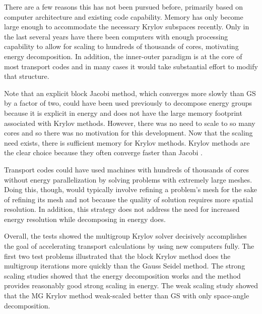 There are a few reasons this has not been pursued before, primarily based on computer architecture and existing code capability. Memory has only become large enough to accommodate the necessary Krylov subspaces recently. Only in the last several years have there been computers with enough processing capability to allow for scaling to hundreds of thousands of cores, motivating energy decomposition. In addition, the inner-outer paradigm is at the core of most transport codes and in many cases it would take substantial effort to modify that structure. 

Note that an explicit block Jacobi method, which converges more slowly than GS by a factor of two, could have been used previously to decompose energy groups because it is explicit in energy and does not have the large memory footprint associated with Krylov methods. However, there was no need to scale to so many cores and so there was no motivation for this development. Now that the scaling need exists, there is sufficient memory for Krylov methods. Krylov methods are the clear choice because they often converge faster than Jacobi \cite{LeVeque2007}. 

Transport codes could have used machines with hundreds of thousands of cores without energy parallelization by solving problems with extremely large meshes. Doing this, though, would typically involve refining a problem's mesh for the sake of refining its mesh and not because the quality of solution requires more spatial resolution. In addition, this strategy does not address the need for increased energy resolution while decomposing in energy does. 

Overall, the tests showed the multigroup Krylov solver decisively accomplishes the goal of accelerating transport calculations by using new computers fully. The first two test problems illustrated that the block Krylov method does the multigroup iterations more quickly than the Gauss Seidel method. The strong scaling studies showed that the energy decomposition works and the method provides reasonably good strong scaling in energy. The weak scaling study showed that the MG Krylov method weak-scaled better than GS with only space-angle decomposition. 

\separatorpage{}
